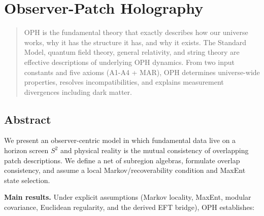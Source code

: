 \section{Observer-Patch Holography}\label{observer-patch-holography}

\begin{quote}
OPH is the fundamental theory that exactly describes how our universe works, why it has the structure it has, and why it exists. The Standard Model, quantum field theory, general relativity, and string theory are effective descriptions of underlying OPH dynamics. From two input constants and five axioms (A1-A4 + MAR), OPH determines universe-wide properties, resolves incompatibilities, and explains measurement divergences including dark matter.
\end{quote}

\subsection{Abstract}\label{abstract}

We present an observer-centric model in which fundamental data live on a horizon screen \(S^2\) and physical reality is the mutual consistency of overlapping patch descriptions. We define a net of subregion algebras, formulate overlap consistency, and assume a local Markov/recoverability condition and MaxEnt state selection.

\textbf{Main results.} Under explicit assumptions (Markov locality, MaxEnt, modular covariance, Euclidean regularity, and the derived EFT bridge), OPH establishes:

